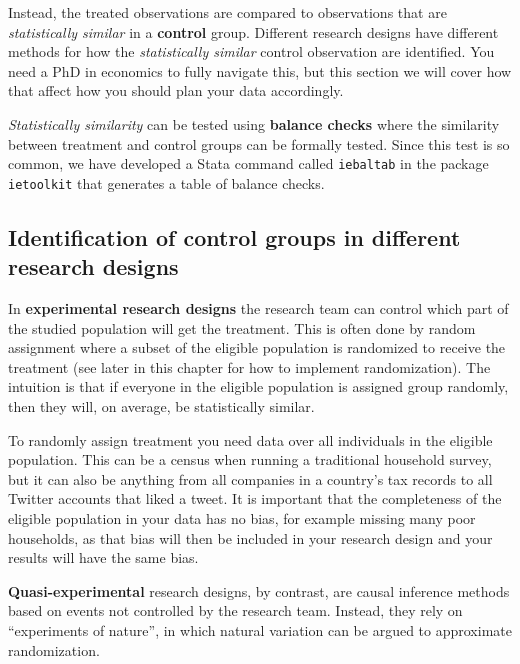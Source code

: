 Instead, the treated observations are compared to observations
that are \textit{statistically similar} in a \textbf{control} group. 
Different research designs have different methods 
for how the \textit{statistically similar} control observation are identified. 
You need a PhD in economics to fully navigate this, 
but this section we will cover how that affect how you should plan your data accordingly.

\textit{Statistically similarity} can be tested using \textbf{balance checks} 
where the similarity between treatment and control groups can be formally tested. 
Since this test is so common, 
we have developed a Stata command called \texttt{iebaltab}
 in the package \texttt{ietoolkit} that generates a table of balance checks.


\subsection{Identification of control groups in different research designs}


In \textbf{experimental research designs} the research team can control which part of the studied population will get the treatment. 
This is often done by random assignment
where a subset of the eligible population is randomized to receive the treatment (see later in this chapter for how to implement randomization). 
The intuition is that if everyone in the eligible population is assigned group randomly, then they will, on average, be statistically similar.

To randomly assign treatment you need data over all individuals in the eligible population. 
This can be a census when running a traditional household survey, 
but it can also be anything from all companies in a country's tax records
to all Twitter accounts that liked a tweet.
It is important that the completeness of the eligible population in your data has no bias, 
for example missing many poor households, 
as that bias will then be included in your research design and your results will have the same bias.


\textbf{Quasi-experimental} research designs,
by contrast, are causal inference methods based on events not controlled by the research team. Instead, they rely on ``experiments of nature'',
in which natural variation can be argued to approximate randomization. 


